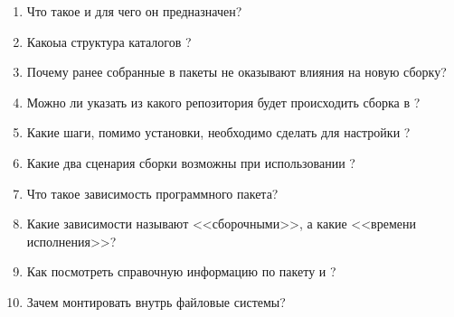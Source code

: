 \begin{enumerate}
	\item Что такое  и для чего он предназначен? 
	\item Какоыа структура каталогов ?
        \item Почему ранее собранные в  пакеты не оказывают влияния на новую сборку?
	\item Можно ли указать из какого репозитория будет происходить сборка в ?
	\item Какие шаги, помимо установки, необходимо сделать для настройки ?
	\item Какие два сценария сборки возможны при использовании ?
        \item Что такое зависимость программного пакета?
	\item Какие зависимости называют <<сборочными>>, а какие <<времени исполнения>>?
        \item Как посмотреть справочную информацию по пакету  и ?
	\item Зачем монтировать внутрь  файловые системы? 
\end{enumerate}

